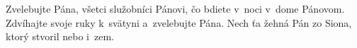 Zvelebujte Pána,
všetci služobníci Pánovi,
\versseparator
čo bdiete v~noci v~dome Pánovom.
Zdvíhajte svoje ruky k~svätyni
a~zvelebujte Pána.
\versseparator
Nech ťa žehná Pán zo Siona,
ktorý stvoril nebo i~zem.
